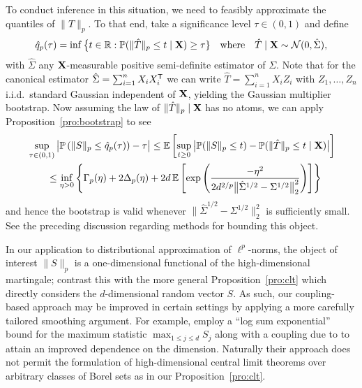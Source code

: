 To conduct inference in this situation, we need to feasibly
approximate the quantiles of $\|T\|_p$.
To that end, take a significance level $\tau\in(0,1)$ and define
%
\begin{equation*}
  \hat q_p(\tau)
  = \inf \big\{t \in \mathbb{R}:
  \mathbb{P}(\|\hat T\|_p \leq t \mid \mathbf{X}) \geq \tau \}
  \quad\text{where}\quad
  \hat T \mid \mathbf{X} \sim \mathcal{N}(0, \hat\Sigma),
\end{equation*}
%
with $\hat\Sigma$ any $\mathbf{X}$-measurable positive semi-definite
estimator of $\Sigma$.
Note that for the canonical estimator $\hat\Sigma = \sum_{i=1}^n X_i X_i^{\mathsf{T}}$
we can write $\hat T =\sum_{i=1}^n X_i Z_i$ with
$Z_1,\dots,Z_n$ i.i.d.\ standard Gaussian independent of $\mathbf{X}$,
yielding the Gaussian multiplier bootstrap.
Now assuming
the law of $\|\hat T\|_p \mid \mathbf{X}$ has no atoms,
we can apply Proposition~\ref{pro:bootstrap}
to see
%
\begin{align*}
  &\sup_{\tau\in(0,1)}
  \big|\mathbb{P}\left(\|S\|_p \leq \hat q_p(\tau)\right) - \tau \big|
  \leq
  \mathbb{E}\left[
    \sup_{t \geq 0}
    \big|
    \mathbb{P}(\|S\|_p \leq t)
    - \mathbb{P}(\|\hat T\|_p \leq t \mid \mathbf{X})
    \big|
  \right] \\
  &\qquad\leq
  \inf_{\eta>0}
  \left\{ \Gamma_p(\eta)
    + 2 \Delta_p(\eta)
    + 2d\, \mathbb{E}\left[
      \exp\left(\frac{-\eta^2}
      {2d^{2/p}\big\|\hat \Sigma^{1/2} - \Sigma^{1/2}\big\|_2^2}\right)
    \right]
  \right\}
\end{align*}
%
and hence the bootstrap is valid whenever
$\|\hat \Sigma^{1/2} - \Sigma^{1/2}\big\|_2^2$ is sufficiently small. See the
preceding discussion regarding methods for bounding this object.

\begin{remark}
  In our application to distributional approximation of $\ell^p$-norms,
  the object of interest $\|S\|_p$ is a
  one-dimensional functional of the high-dimensional martingale;
  contrast this with the more general Proposition~\ref{pro:clt} which
  directly considers the $d$-dimensional random vector $S$.
  As such, our coupling-based approach may be improved in certain settings
  by applying a more carefully tailored smoothing argument.
  For example, \citet{belloni2018high}
  employ a ``log sum exponential'' bound
  \citep[see also][]{chernozhukov2013gaussian}
  for the maximum statistic
  $\max_{1 \leq j \leq d} S_j$
  along with a coupling due to \citet{chernozhukov2014gaussian} to attain
  an improved dependence on the dimension.
  Naturally their approach does not permit the formulation of
  high-dimensional central limit theorems over arbitrary classes of
  Borel sets as in our Proposition~\ref{pro:clt}.
\end{remark}

